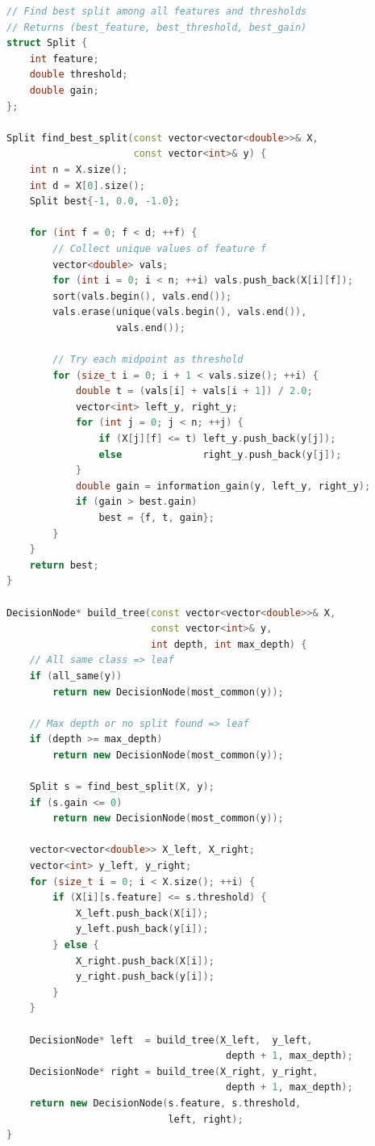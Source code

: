 \begin{lstlisting}[language=C++]
// Find best split among all features and thresholds
// Returns (best_feature, best_threshold, best_gain)
struct Split {
    int feature;
    double threshold;
    double gain;
};

Split find_best_split(const vector<vector<double>>& X,
                      const vector<int>& y) {
    int n = X.size();
    int d = X[0].size();
    Split best{-1, 0.0, -1.0};

    for (int f = 0; f < d; ++f) {
        // Collect unique values of feature f
        vector<double> vals;
        for (int i = 0; i < n; ++i) vals.push_back(X[i][f]);
        sort(vals.begin(), vals.end());
        vals.erase(unique(vals.begin(), vals.end()),
                   vals.end());

        // Try each midpoint as threshold
        for (size_t i = 0; i + 1 < vals.size(); ++i) {
            double t = (vals[i] + vals[i + 1]) / 2.0;
            vector<int> left_y, right_y;
            for (int j = 0; j < n; ++j) {
                if (X[j][f] <= t) left_y.push_back(y[j]);
                else              right_y.push_back(y[j]);
            }
            double gain = information_gain(y, left_y, right_y);
            if (gain > best.gain)
                best = {f, t, gain};
        }
    }
    return best;
}

DecisionNode* build_tree(const vector<vector<double>>& X,
                         const vector<int>& y,
                         int depth, int max_depth) {
    // All same class => leaf
    if (all_same(y))
        return new DecisionNode(most_common(y));

    // Max depth or no split found => leaf
    if (depth >= max_depth)
        return new DecisionNode(most_common(y));

    Split s = find_best_split(X, y);
    if (s.gain <= 0)
        return new DecisionNode(most_common(y));

    vector<vector<double>> X_left, X_right;
    vector<int> y_left, y_right;
    for (size_t i = 0; i < X.size(); ++i) {
        if (X[i][s.feature] <= s.threshold) {
            X_left.push_back(X[i]);
            y_left.push_back(y[i]);
        } else {
            X_right.push_back(X[i]);
            y_right.push_back(y[i]);
        }
    }

    DecisionNode* left  = build_tree(X_left,  y_left,
                                      depth + 1, max_depth);
    DecisionNode* right = build_tree(X_right, y_right,
                                      depth + 1, max_depth);
    return new DecisionNode(s.feature, s.threshold,
                            left, right);
}
\end{lstlisting}

